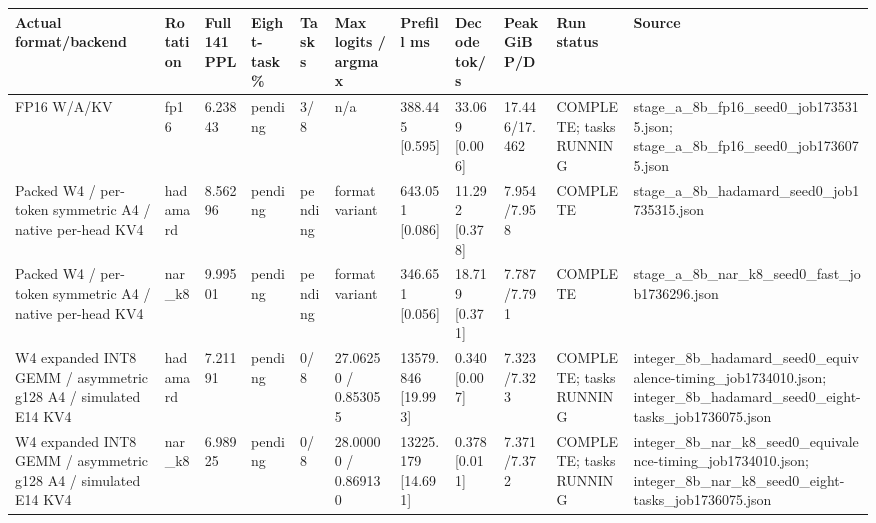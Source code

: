 \begin{tabular}{lllllllllll}
\toprule
Actual format/backend & Rotation & Full141 PPL & Eight-task \% & Tasks & Max logits / argmax & Prefill ms & Decode tok/s & Peak GiB P/D & Run status & Source \\
\midrule
FP16 W/A/KV & fp16 & 6.23843 & pending & 3/8 & n/a & 388.445 [0.595] & 33.069 [0.006] & 17.446/17.462 & COMPLETE; tasks RUNNING & stage\_a\_8b\_fp16\_seed0\_job1735315.json; stage\_a\_8b\_fp16\_seed0\_job1736075.json \\
Packed W4 / per-token symmetric A4 / native per-head KV4 & hadamard & 8.56296 & pending & pending & format variant & 643.051 [0.086] & 11.292 [0.378] & 7.954/7.958 & COMPLETE & stage\_a\_8b\_hadamard\_seed0\_job1735315.json \\
Packed W4 / per-token symmetric A4 / native per-head KV4 & nar\_k8 & 9.99501 & pending & pending & format variant & 346.651 [0.056] & 18.719 [0.371] & 7.787/7.791 & COMPLETE & stage\_a\_8b\_nar\_k8\_seed0\_fast\_job1736296.json \\
W4 expanded INT8 GEMM / asymmetric g128 A4 / simulated E14 KV4 & hadamard & 7.21191 & pending & 0/8 & 27.06250 / 0.853055 & 13579.846 [19.993] & 0.340 [0.007] & 7.323/7.323 & COMPLETE; tasks RUNNING & integer\_8b\_hadamard\_seed0\_equivalence-timing\_job1734010.json; integer\_8b\_hadamard\_seed0\_eight-tasks\_job1736075.json \\
W4 expanded INT8 GEMM / asymmetric g128 A4 / simulated E14 KV4 & nar\_k8 & 6.98925 & pending & 0/8 & 28.00000 / 0.869130 & 13225.179 [14.691] & 0.378 [0.011] & 7.371/7.372 & COMPLETE; tasks RUNNING & integer\_8b\_nar\_k8\_seed0\_equivalence-timing\_job1734010.json; integer\_8b\_nar\_k8\_seed0\_eight-tasks\_job1736075.json \\
\bottomrule
\end{tabular}
